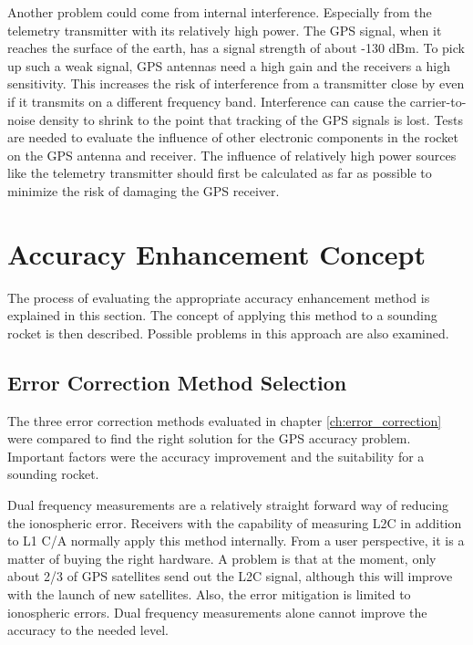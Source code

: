 Another problem could come from internal interference.
Especially from the telemetry transmitter with its relatively high power.
The GPS signal, when it reaches the surface of the earth, has a signal strength of about -130 dBm.
To pick up such a weak signal, GPS antennas need a high gain and the receivers a high sensitivity.
This increases the risk of interference from a transmitter close by even if it transmits on a different frequency band.
Interference can cause the carrier-to-noise density to shrink to the point that tracking of the GPS signals is lost.
Tests are needed to evaluate the influence of other electronic components in the rocket on the GPS antenna and receiver.
The influence of relatively high power sources like the telemetry transmitter should first be calculated as far as possible to minimize the risk of damaging the GPS receiver.


\section{Accuracy Enhancement Concept}

The process of evaluating the appropriate accuracy enhancement method is explained in this section.
The concept of applying this method to a sounding rocket is then described.
Possible problems in this approach are also examined.

\subsection{Error Correction Method Selection}

The three error correction methods evaluated in chapter \ref{ch:error_correction} were compared to find the right solution for the GPS accuracy problem.
Important factors were the accuracy improvement and the suitability for a sounding rocket.

Dual frequency measurements are a relatively straight forward way of reducing the ionospheric error.
Receivers with the capability of measuring L2C in addition to L1 C/A normally apply this method internally.
From a user perspective, it is a matter of buying the right hardware.
A problem is that at the moment, only about 2/3 of GPS satellites send out the L2C signal, although this will improve with the launch of new satellites.
Also, the error mitigation is limited to ionospheric errors.
Dual frequency measurements alone cannot improve the accuracy to the needed level.

